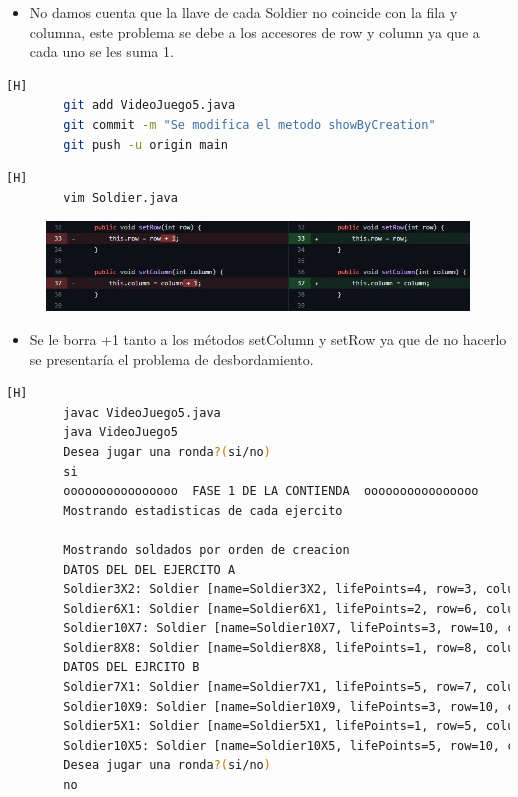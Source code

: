 \documentclass{article}
\begin{document}
	\begin{itemize}	
		\item No damos cuenta que la llave de cada Soldier no coincide con la fila y columna, este problema se debe a los accesores de row y column ya que a cada uno se les suma 1.
	\end{itemize}
	
	
	\begin{lstlisting}[language=bash,caption={Commit: 8d7511cfd2f009ae04e1691cf9f2f85b3c80b0f7}][H]
		git add VideoJuego5.java
		git commit -m "Se modifica el metodo showByCreation"			
		git push -u origin main
	\end{lstlisting}
	
	
	
	
	
	

	
	
	
	
	
	\begin{lstlisting}[language=bash,caption={Se modifica la clase Soldier}][H]
		vim Soldier.java
	\end{lstlisting}
	
	\begin{figure}[H]
		\centering
		\includegraphics[width=1\textwidth,keepaspectratio]{img/classSoldier.jpg}
	\end{figure}
	
	\begin{itemize}	
		\item Se le borra +1 tanto a los métodos setColumn y setRow ya que de no hacerlo se presentaría el problema de desbordamiento.
	\end{itemize}
	
	\begin{lstlisting}[language=bash,caption={Compilando y probando}][H]
		javac VideoJuego5.java
		java VideoJuego5
		Desea jugar una ronda?(si/no)
		si
		oooooooooooooooo  FASE 1 DE LA CONTIENDA  oooooooooooooooo
		Mostrando estadisticas de cada ejercito
		
		Mostrando soldados por orden de creacion
		DATOS DEL DEL EJERCITO A
		Soldier3X2: Soldier [name=Soldier3X2, lifePoints=4, row=3, column=2]
		Soldier6X1: Soldier [name=Soldier6X1, lifePoints=2, row=6, column=1]
		Soldier10X7: Soldier [name=Soldier10X7, lifePoints=3, row=10, column=7]
		Soldier8X8: Soldier [name=Soldier8X8, lifePoints=1, row=8, column=8]
		DATOS DEL EJRCITO B
		Soldier7X1: Soldier [name=Soldier7X1, lifePoints=5, row=7, column=1]
		Soldier10X9: Soldier [name=Soldier10X9, lifePoints=3, row=10, column=9]
		Soldier5X1: Soldier [name=Soldier5X1, lifePoints=1, row=5, column=1]
		Soldier10X5: Soldier [name=Soldier10X5, lifePoints=5, row=10, column=5]
		Desea jugar una ronda?(si/no)
		no
	\end{lstlisting}
	
\end{document}
